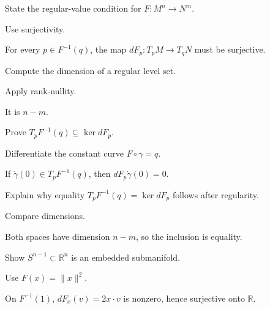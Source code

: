 \begin{exercise}\label{exr:vii06-05}
State the regular-value condition for \(F:M^n\to N^m\).
\end{exercise}
\begin{hint}
Use surjectivity.
\end{hint}
\begin{solution}
For every \(p\in F^{-1}(q)\), the map \(dF_p:T_pM\to T_qN\) must be surjective.
\end{solution}

\begin{exercise}\label{exr:vii06-06}
Compute the dimension of a regular level set.
\end{exercise}
\begin{hint}
Apply rank-nullity.
\end{hint}
\begin{solution}
It is \(n-m\).
\end{solution}

\begin{exercise}\label{exr:vii06-07}
Prove \(T_pF^{-1}(q)\subseteq\ker dF_p\).
\end{exercise}
\begin{hint}
Differentiate the constant curve \(F\circ\gamma=q\).
\end{hint}
\begin{solution}
If \(\dot\gamma(0)\in T_pF^{-1}(q)\), then \(dF_p\dot\gamma(0)=0\).
\end{solution}

\begin{exercise}\label{exr:vii06-08}
Explain why equality \(T_pF^{-1}(q)=\ker dF_p\) follows after regularity.
\end{exercise}
\begin{hint}
Compare dimensions.
\end{hint}
\begin{solution}
Both spaces have dimension \(n-m\), so the inclusion is equality.
\end{solution}

\begin{exercise}\label{exr:vii06-09}
Show \(S^{n-1}\subset\mathbb R^n\) is an embedded submanifold.
\end{exercise}
\begin{hint}
Use \(F(x)=\|x\|^2\).
\end{hint}
\begin{solution}
On \(F^{-1}(1)\), \(dF_x(v)=2x\cdot v\) is nonzero, hence surjective onto \(\mathbb R\).
\end{solution}

